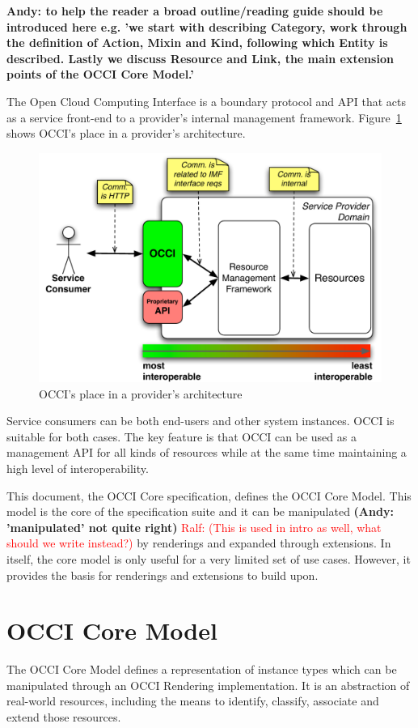 \documentclass[10pt,a4paper]{article}
\newcommand{\ralf}[1]{\textcolor{red}{Ralf: #1}}
\begin{document}
\textbf{Andy: to help the reader a broad outline/reading guide should be introduced here
e.g. 'we start with describing Category, work through the definition of Action, Mixin and Kind,
following which Entity is described. Lastly we discuss Resource and Link, the main extension
points of the OCCI Core Model.'}

The Open Cloud Computing Interface is a boundary protocol and API
that acts as a service front-end to a provider's internal management
framework. Figure~\ref{fig:placement} shows OCCI's place in a
provider's architecture.
\begin{figure}[h]
	\centering
	\includegraphics[scale=0.5]{figs/occi-intro.pdf}
	\caption{OCCI's place in a provider's architecture}
	\label{fig:placement}
\end{figure}
Service consumers can be both end-users and other system instances. OCCI is
suitable for both cases. The key feature is that OCCI can be used as a
management API for all kinds of resources while at the same time maintaining a
high level of interoperability.

This document, the OCCI Core specification, defines the OCCI Core Model. This
model is the core of the specification suite and it can be manipulated 
\textbf{(Andy: 'manipulated' not quite right)}
\ralf{(This is used in intro as well, what should we write instead?)}
by renderings and expanded 
through extensions. In itself, the core model is only useful
for a very limited set of use cases. However, it provides the basis for
renderings and extensions to build upon.

\section{OCCI Core Model}
The OCCI Core Model defines a representation of instance types which can be
manipulated through an OCCI Rendering implementation. 
It is an abstraction of real-world 
resources, including the means to identify, classify, associate 
and extend those resources. 
\end{document}
